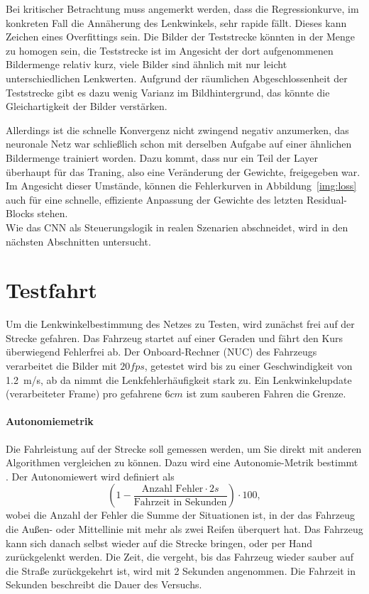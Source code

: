 Bei kritischer Betrachtung muss angemerkt werden, dass die Regressionkurve, im konkreten Fall die Annäherung des Lenkwinkels, sehr rapide fällt.  Dieses kann Zeichen eines Overfittings sein. Die Bilder der Teststrecke könnten in der Menge zu homogen sein, die Teststrecke ist im Angesicht der dort aufgenommenen Bildermenge relativ kurz, viele Bilder sind ähnlich mit nur leicht unterschiedlichen Lenkwerten. Aufgrund der räumlichen Abgeschlossenheit der Teststrecke gibt es dazu wenig Varianz im Bildhintergrund, das könnte die Gleichartigkeit der Bilder verstärken.

Allerdings ist die schnelle Konvergenz nicht zwingend negativ anzumerken, das neuronale Netz war schließlich schon mit derselben Aufgabe auf einer ähnlichen Bildermenge trainiert worden. Dazu kommt, dass nur ein Teil der Layer überhaupt für das Traning, also eine Veränderung der Gewichte, freigegeben war. Im Angesicht dieser Umstände, können die Fehlerkurven in Abbildung~\ref{img:loss} auch für eine schnelle, effiziente Anpassung der Gewichte des letzten Residual-Blocks stehen.\\
Wie das CNN als Steuerungslogik in realen Szenarien abschneidet, wird in den nächsten Abschnitten untersucht.

\section{Testfahrt}
Um die Lenkwinkelbestimmung des Netzes zu Testen, wird zunächst frei auf der Strecke gefahren. Das Fahrzeug startet auf einer Geraden und fährt den Kurs überwiegend Fehlerfrei ab. Der Onboard-Rechner (NUC) des Fahrzeugs verarbeitet die Bilder mit $20 fps$, getestet wird bis zu einer Geschwindigkeit von \SI{1.2}{\meter/\second}, ab da nimmt die Lenkfehlerhäufigkeit stark zu. Ein Lenkwinkelupdate (verarbeiteter Frame) pro gefahrene $6 cm$ ist zum sauberen Fahren die Grenze.\\
\paragraph{Autonomiemetrik}
Die Fahrleistung auf der Strecke soll gemessen werden, um Sie direkt mit anderen Algorithmen vergleichen zu können. Dazu wird eine Autonomie-Metrik bestimmt \cite{bojarski2016end}. Der Autonomiewert wird definiert als 
\begin{equation}
\label{mat:autonomie}
(1 -  \frac{\text{Anzahl Fehler}\cdot 2 s}{\text{Fahrzeit in Sekunden}})\cdot 100,
\end{equation}
wobei die Anzahl der Fehler die Summe der Situationen ist, in der das Fahrzeug die Außen- oder Mittellinie mit mehr als zwei Reifen überquert hat. Das Fahrzeug kann sich danach selbst wieder auf die Strecke bringen, oder per Hand zurückgelenkt werden. Die Zeit, die vergeht, bis das Fahrzeug wieder sauber auf die Straße zurückgekehrt ist, wird mit 2 Sekunden angenommen. Die Fahrzeit in Sekunden beschreibt die Dauer des Versuchs.

